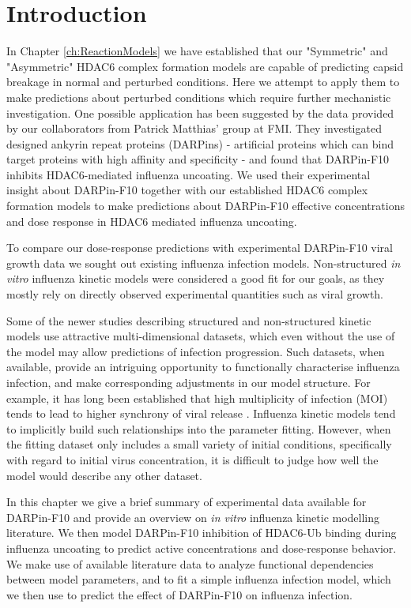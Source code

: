 \section{Introduction}


In Chapter \ref{ch:ReactionModels} we have established that our "Symmetric" and "Asymmetric" HDAC6 complex formation models are capable of predicting capsid breakage in normal and perturbed conditions. Here we attempt to apply them to make predictions about perturbed conditions which require further mechanistic investigation. One possible application has been suggested by the data provided by our collaborators from Patrick Matthias' group at FMI. They investigated designed ankyrin repeat proteins (DARPins) - artificial proteins which can bind target proteins with high affinity and specificity - and found that DARPin-F10 inhibits HDAC6-mediated influenza uncoating. We used their experimental insight about DARPin-F10 together with our established HDAC6 complex formation models to make predictions about DARPin-F10 effective concentrations and dose response in HDAC6 mediated influenza uncoating.

To compare our dose-response predictions with experimental DARPin-F10 viral growth data we sought out existing influenza infection models. Non-structured \textit{in vitro} influenza kinetic models were considered a good fit for our goals, as they mostly rely on directly observed experimental quantities such as viral growth.

Some of the newer studies describing structured and non-structured kinetic models \cite{rudiger2019multiscale, schulze2009infection} use attractive multi-dimensional datasets, which even without the use of the model may allow predictions of infection progression. Such datasets, when available, provide an intriguing opportunity to functionally characterise influenza infection, and make corresponding adjustments in our model structure. For example, it has long been established that high multiplicity of infection (MOI) tends to lead to higher synchrony of viral release \cite{cairns1957asynchrony}. Influenza kinetic models tend to implicitly build such relationships into the parameter fitting. However, when the fitting dataset only includes a small variety of initial conditions, specifically with regard to initial virus concentration, it is difficult to judge how well the model would describe any other dataset.

In this chapter we give a brief summary of experimental data available for DARPin-F10 \cite{DarpinData} and provide an overview on \textit{in vitro} influenza kinetic modelling literature. We then model DARPin-F10 inhibition of HDAC6-Ub binding during influenza uncoating to predict active concentrations and dose-response behavior. We make use of available literature data \cite{rudiger2019multiscale, schulze2009infection} to analyze functional dependencies between model parameters, and to fit a simple influenza infection model, which we then use to predict the effect of DARPin-F10 on influenza infection.

